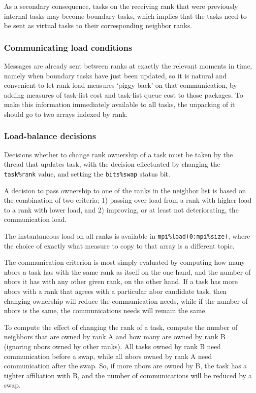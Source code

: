 \documentclass[paper=a4,fontsize=11pt]{scrartcl}
\numberwithin{equation}{section}		%
\numberwithin{figure}{section}			%
\numberwithin{table}{section}				%
\newcommand{\codecolor}{\color{Blue}}
\newcommand{\Code}[1]{{\codecolor\texttt{#1}}}
\begin{document}
As a secondary consequence, tasks on the receiving rank that were previously internal tasks may become boundary tasks, which implies that the tasks need to be sent as virtual tasks to their corresponding neighbor ranks.

\subsubsection{Communicating load conditions}
Messages are already sent between ranks at exactly the relevant moments in time, namely when boundary tasks have just been updated, so it is natural and convenient to let rank load measures `piggy back' on that communication, by adding measures of task-list cost and task-list queue cost to those packages.  To make this information immediately available to all tasks, the unpacking of it should go to two arrays indexed by rank.

\subsubsection{Load-balance decisions}
Decisions whether to change rank ownership of a task must be taken by the thread that updates task, with the decision effectuated by changing the \Code{task\%rank} value, and setting the \Code{bits\%swap} status bit.

A decision to pass ownership to one of the ranks in the neighbor list is based on the combination of two criteria; 1) passing over load from a rank with higher load to a rank with lower load, and 2) improving, or at least not deteriorating, the communication load.

The instantaneous load on all ranks is available in \Code{mpi\%load(0:mpi\%size)}, where the choice of exactly what measure to copy to that array is a different topic.

The communication criterion is most simply evaluated by computing how many nbors a task has with the same rank as itself on the one hand, and the number of nbors it has with any other given rank, on the other hand. If a task has more nbors with a rank that agrees with a particular nbor candidate task, then changing ownership will reduce the communication needs, while if the number of nbors is the same, the communications needs will remain the same.  

To compute the effect of changing the rank of a task, compute the number of neighbors that are owned by rank A and how many are owned by rank B (ignoring nbors owned by other ranks).  All tasks owned by rank B need communication before a swap, while all nbors owned by rank A need communication after the swap.  So, if more nbors are owned by B, the task has a tighter affiliation with B, and the number of communications will be reduced by a swap.
\end{document}
